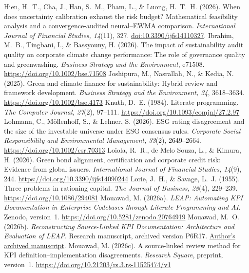 \begin{thebibliography}{}
 Hien, H.~T., Cha, J., Han, S.~M., Pham, L., \& Luong, H.~T.~H. (2026). When does uncertainty calibration exhaust the risk budget? Mathematical feasibility analysis and a convergence-audited neural--EWMA comparison. \emph{International Journal of Financial Studies, 14}(11), 327. \href{https://www.mdpi.com/2227-7072/14/11/327}{doi:10.3390/ijfs14110327}.
 Ibrahim, M.~B., Tingbani, I., \& Bassyouny, H. (2026). The impact of sustainability audit quality on corporate climate change performance: The role of governance quality and greenwashing. \emph{Business Strategy and the Environment}, e71508. \url{https://doi.org/10.1002/bse.71508}
 Joshipura, M., Nasrallah, N., \& Kedia, N. (2025). Green and climate finance for sustainability: Hybrid review and framework development. \emph{Business Strategy and the Environment, 34}, 3618--3634. \url{https://doi.org/10.1002/bse.4173}
 Knuth, D.~E. (1984). Literate programming. \emph{The Computer Journal, 27}(2), 97--111. \url{https://doi.org/10.1093/comjnl/27.2.97}
 Lohmann, C., Möllenhoff, S., \& Lehner, S. (2026). ESG rating disagreement and the size of the investable universe under ESG consensus rules. \emph{Corporate Social Responsibility and Environmental Management, 33}(2), 2649--2664. \url{https://doi.org/10.1002/csr.70313}
 Loiola, R.~R., de Melo Souza, L., \& Kimura, H. (2026). Green bond alignment, certification and corporate credit risk: Evidence from global issuers. \emph{International Journal of Financial Studies, 14}(9), 244. \url{https://doi.org/10.3390/ijfs14090244}
 Lorie, J.~H., \& Savage, L.~J. (1955). Three problems in rationing capital. \emph{The Journal of Business, 28}(4), 229--239. \url{https://doi.org/10.1086/294081}
 Mouawad, M. (2026a). \emph{LEAP: Automating KPI Documentation in Enterprise Codebases through Literate Programming and AI}. Zenodo, version~1. \url{https://doi.org/10.5281/zenodo.20764919}
 Mouawad, M.~O. (2026b). \emph{Reconstructing Source-Linked KPI Documentation: Architecture and Evaluation of LEAP}. Research manuscript, archived version P6R17. \href{https://github.com/Meshaal-Mouawad/LEAP-Paper1-Evidence/blob/a20b243683a262fd43987013117120c313ec8fa8/SCP_P6R17/01_Manuscript_SCP_P6R17.pdf}{Author's archived manuscript}.
 Mouawad, M. (2026c). A source-linked review method for KPI definition--implementation disagreements. \emph{Research Square}, preprint, version~1. \url{https://doi.org/10.21203/rs.3.rs-11525474/v1}

\end{thebibliography}
